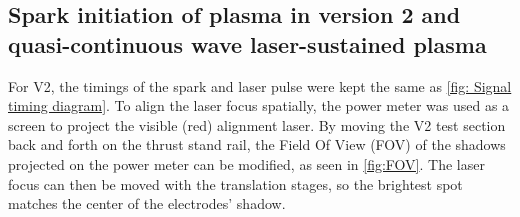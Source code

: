         \subsection{Spark initiation of plasma in version 2 and quasi-continuous wave laser-sustained plasma}

            For V2, the timings of the spark and laser pulse were kept the same as \autoref{fig: Signal timing diagram}. To align the laser focus spatially, the power meter was used as a screen to project the visible (red) alignment laser. By moving the V2 test section back and forth on the thrust stand rail, the Field Of View (FOV) of the shadows projected on the power meter can be modified, as seen in \autoref{fig:FOV}. The laser focus can then be moved with the translation stages, so the brightest spot matches the center of the electrodes' shadow.
            
